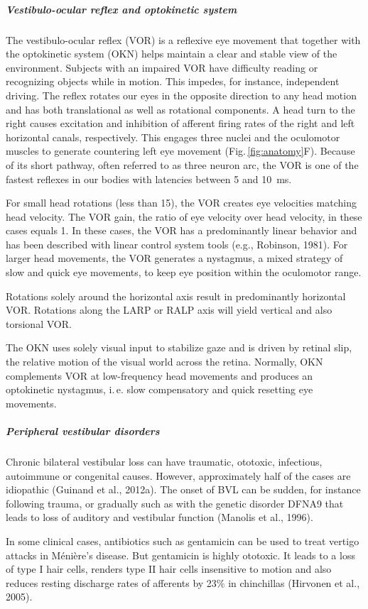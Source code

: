 \subparagraph{Vestibulo-ocular reflex and optokinetic system}
The vestibulo-ocular reflex (VOR) is a reflexive eye movement that together with the optokinetic system (OKN) helps maintain a clear and stable view of the environment. Subjects with an impaired VOR have difficulty reading or recognizing objects while in motion. This impedes, for instance, independent driving. The reflex rotates our eyes in the opposite direction to any head motion and has both translational as well as rotational components. A head turn to the right causes excitation and inhibition of afferent firing rates of the right and left horizontal canals, respectively. This engages three nuclei and the oculomotor muscles to generate countering left eye movement (Fig.\,\ref{fig:anatomy}F). Because of its short pathway, often referred to as three neuron arc, the VOR is one of the fastest reflexes in our bodies with latencies between 5 and \SI{10}{\milli\second}.

For small head rotations (less than 15\degree), the VOR creates eye velocities matching head velocity. The VOR gain, the ratio of eye velocity over head velocity, in these cases equals 1. In these cases, the VOR has a predominantly linear behavior and has been described with linear control system tools (e.g., Robinson, 1981). For larger head movements, the VOR generates a nystagmus, a mixed strategy of slow and quick eye movements, to keep eye position within the oculomotor range.

Rotations solely around the horizontal axis result in predominantly horizontal VOR. Rotations along the LARP or RALP axis will yield vertical and also torsional VOR.

The OKN uses solely visual input to stabilize gaze and is driven by retinal slip, the relative motion of the visual world across the retina. Normally, OKN complements VOR at low-frequency head movements and produces an optokinetic nystagmus, i.\,e. slow compensatory and quick resetting eye movements.

\subparagraph{Peripheral vestibular disorders}
Chronic bilateral vestibular  loss can have traumatic, ototoxic, infectious, autoimmune or congenital causes. However, approximately half of the cases are idiopathic (Guinand et al., 2012a). The onset of BVL can be sudden, for instance following trauma, or gradually such as with the genetic disorder DFNA9 that leads to loss of auditory and vestibular function (Manolis et al., 1996).

In some clinical cases, antibiotics such as gentamicin can be used to treat vertigo attacks in Ménière's disease. But gentamicin is highly ototoxic. It leads to a loss of type I hair cells, renders type II hair cells insensitive to motion and also reduces resting discharge rates of afferents by 23\% in chinchillas (Hirvonen et al., 2005).
 
